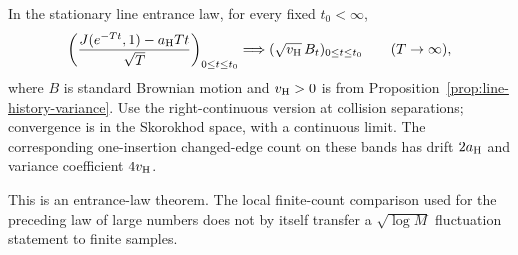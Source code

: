 \documentclass[11pt,letterpaper]{article}
\begin{document}
\begin{theorem}
\label{thm:line-history-CLT}
In the stationary line entrance law, for every fixed $t_0<\infty$,
\begin{equation}\label{eq:line-history-CLT}
 \left(\frac{J(e^{-Tt},1)-a_{\rm H}Tt}{\sqrt T}\right)_{0\le t\le t_0}
       \Longrightarrow (\sqrt{v_{\rm H}}\,B_t)_{0\le t\le t_0}
                                      \qquad(T\to\infty),
\end{equation}
where $B$ is standard Brownian motion and $v_{\rm H}>0$ is from
Proposition~\ref{prop:line-history-variance}. Use the right-continuous
version at collision separations; convergence is in the Skorokhod
space, with a continuous limit. The corresponding one-insertion
changed-edge count on these bands has drift $2a_{\rm H}$ and
variance coefficient $4v_{\rm H}$.

This is an entrance-law theorem. The local finite-count comparison
used for the preceding law of large numbers does not by itself
transfer a $\sqrt{\log M}$ fluctuation statement to finite samples.
\end{theorem}
\end{document}
